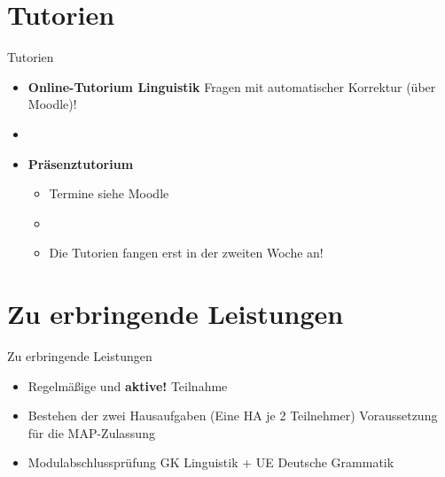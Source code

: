 %
\section{Tutorien}

\begin{frame}{Tutorien}

	\begin{itemize}
		\item \textbf{Online-Tutorium Linguistik} \ras Fragen mit automatischer Korrektur (über Moodle)!\\
		\item[]
		\item \textbf{Präsenztutorium}
		
		\begin{itemize}
			\item Termine siehe Moodle %
			\item[]
			\item Die Tutorien fangen erst in der zweiten Woche an!
		\end{itemize}
		
	\end{itemize}
	
\end{frame}


%
\section{Zu erbringende Leistungen}

\begin{frame}{Zu erbringende Leistungen}

	\begin{itemize}
		\item Regelmäßige und \textbf{aktive!} Teilnahme
		\item Bestehen der zwei Hausaufgaben (Eine HA je 2 Teilnehmer) \ras Voraussetzung für die MAP-Zulassung
		\item Modulabschlussprüfung \ras GK Linguistik + UE Deutsche Grammatik
	\end{itemize}
	
\end{frame}


